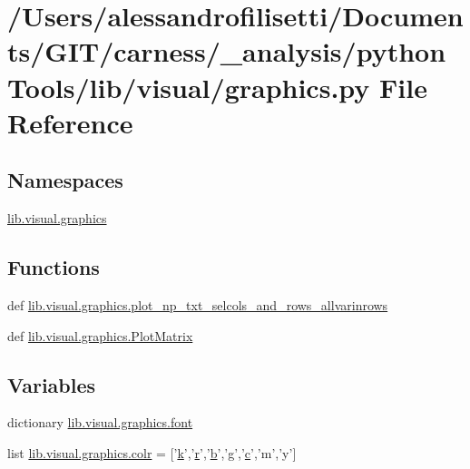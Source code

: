 \hypertarget{a00097}{\section{/\-Users/alessandrofilisetti/\-Documents/\-G\-I\-T/carness/\-\_\-analysis/python\-Tools/lib/visual/graphics.py File Reference}
\label{a00097}
}
\subsection*{Namespaces}
\begin{DoxyCompactItemize}
\item 
\hyperlink{a00150}{lib.\-visual.\-graphics}
\end{DoxyCompactItemize}
\subsection*{Functions}
\begin{DoxyCompactItemize}
\item 
def \hyperlink{a00150_aa27c34e948992165c7a98e5ca3605549}{lib.\-visual.\-graphics.\-plot\-\_\-np\-\_\-txt\-\_\-selcols\-\_\-and\-\_\-rows\-\_\-allvarinrows}
\item 
def \hyperlink{a00150_a99e047c066345a973bfbb527e8a91085}{lib.\-visual.\-graphics.\-Plot\-Matrix}
\end{DoxyCompactItemize}
\subsection*{Variables}
\begin{DoxyCompactItemize}
\item 
dictionary \hyperlink{a00150_a3c83ccb4d4d1fcb0ea5f6b8616a1d0df}{lib.\-visual.\-graphics.\-font}
\item 
list \hyperlink{a00150_aae94b6a9df961a260c0fa476e2b4693a}{lib.\-visual.\-graphics.\-colr} = \mbox{[}'\hyperlink{a00110_abf70355c2e58f64c6b18bda1b9bccfd7}{k}','\hyperlink{a00031_ac862e7284527eb913b1351c8bfb8e079}{r}','\hyperlink{a00035_a50b4f3ddde10830a3976c71083aaee3f}{b}','g','\hyperlink{a00035_a6be92348ba85ef257b11d06209e1d7b6}{c}','m','y'\mbox{]}
\end{DoxyCompactItemize}
